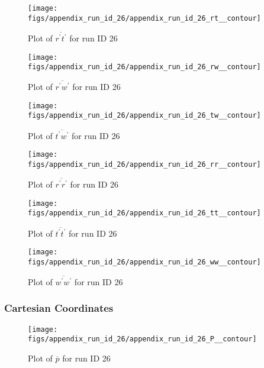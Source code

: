 \begin{figure}[H]
\centering
\texttt{[image: figs/appendix\_run\_id\_26/appendix\_run\_id\_26\_rt\_\_contour]}
\caption{Plot of $\overline{r^\prime t^\prime}$ for run ID 26}
\label{fig:appendix_run_id_26_rt__contour}
\end{figure}


\begin{figure}[H]
\centering
\texttt{[image: figs/appendix\_run\_id\_26/appendix\_run\_id\_26\_rw\_\_contour]}
\caption{Plot of $\overline{r^\prime w^\prime}$ for run ID 26}
\label{fig:appendix_run_id_26_rw__contour}
\end{figure}


\begin{figure}[H]
\centering
\texttt{[image: figs/appendix\_run\_id\_26/appendix\_run\_id\_26\_tw\_\_contour]}
\caption{Plot of $\overline{t^\prime w^\prime}$ for run ID 26}
\label{fig:appendix_run_id_26_tw__contour}
\end{figure}


\begin{figure}[H]
\centering
\texttt{[image: figs/appendix\_run\_id\_26/appendix\_run\_id\_26\_rr\_\_contour]}
\caption{Plot of $\overline{r^\prime r^\prime}$ for run ID 26}
\label{fig:appendix_run_id_26_rr__contour}
\end{figure}


\begin{figure}[H]
\centering
\texttt{[image: figs/appendix\_run\_id\_26/appendix\_run\_id\_26\_tt\_\_contour]}
\caption{Plot of $\overline{t^\prime t^\prime}$ for run ID 26}
\label{fig:appendix_run_id_26_tt__contour}
\end{figure}


\begin{figure}[H]
\centering
\texttt{[image: figs/appendix\_run\_id\_26/appendix\_run\_id\_26\_ww\_\_contour]}
\caption{Plot of $\overline{w^\prime w^\prime}$ for run ID 26}
\label{fig:appendix_run_id_26_ww__contour}
\end{figure}


\subsubsection{Cartesian Coordinates}
\begin{figure}[H]
\centering
\texttt{[image: figs/appendix\_run\_id\_26/appendix\_run\_id\_26\_P\_\_contour]}
\caption{Plot of $\overline{p}$ for run ID 26}
\label{fig:appendix_run_id_26_P__contour}
\end{figure}


